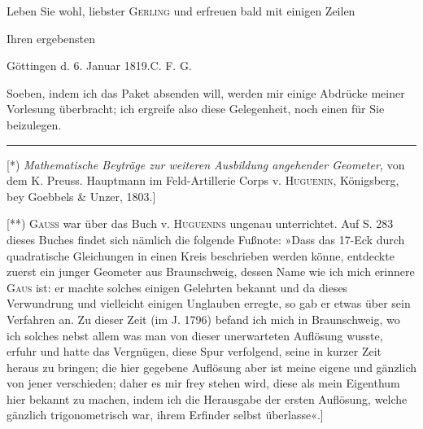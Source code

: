 Leben Sie wohl, liebster \textsc{Gerling} und erfreuen bald mit einigen Zeilen
\begin{flushright}Ihren ergebensten\end{flushright}
\noindent\hspace*{\parindent}Göttingen d. 6. Januar 1819.\hfill C. F. G.\par
\medskip
Soeben, indem ich das Paket absenden will, werden mir einige Abdrücke meiner Vorlesung
überbracht; ich ergreife also diese Gelegenheit, noch einen für Sie beizulegen.
\par\smallskip\noindent\rule{.25\linewidth}{.4pt}\par\smallskip
{\small\noindent\hspace*{\parindent}[*) \textit{Mathematische Beyträge zur weiteren Ausbildung
angehender Geometer,} von dem K. Preuss. Hauptmann im Feld-Artillerie Corps v. \textsc{Huguenin},
Königsberg, bey Goebbels \& Unzer, 1803.]\par
\noindent\hspace*{\parindent}[**) \textsc{Gauss} war über das Buch v. \textsc{Huguenins} ungenau
unterrichtet. Auf S. 283 dieses Buches findet sich nämlich die folgende Fußnote:
»Dass das 17-Eck durch quadratische Gleichungen in einen Kreis beschrieben werden könne,
entdeckte zuerst ein junger Geometer aus Braunschweig, dessen Name wie ich mich erinnere
\textsc{Gaus} ist: er machte solches einigen Gelehrten bekannt und da dieses Verwundrung und
vielleicht einigen Unglauben erregte, so gab er etwas über sein Verfahren an. Zu dieser Zeit
(im J. 1796) befand ich mich in Braunschweig, wo ich solches nebst allem was man von dieser
unerwarteten Auflösung wusste, erfuhr und hatte das Vergnügen, diese Spur verfolgend,
seine  in kurzer Zeit heraus zu bringen; die hier gegebene Auflösung
aber ist meine eigene und gänzlich von jener verschieden; daher es mir frey stehen wird,
diese als mein Eigenthum hier bekannt zu machen, indem ich die Herausgabe der ersten Auflösung,
welche gänzlich trigonometrisch war, ihrem Erfinder selbst überlasse«.]\par}
\ClosingRule
\clearpage
